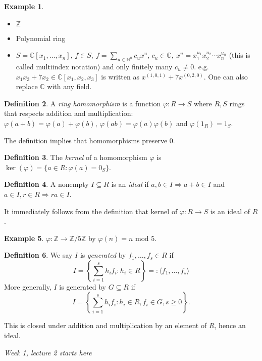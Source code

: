 \documentclass[a4paper]{article}
\newcommand{\Mod}{\text{ mod }}
\theoremstyle{definition}
\newtheorem{defn}{Definition}[subsection]
\newtheorem{example}[defn]{Example}
\begin{document}
\begin{example}
\begin{itemize}
\item $\mathbb Z$
\item Polynomial ring
\item $S=\mathbb C[x_1,\ldots,x_n]$, $\displaystyle f\in S,\ f=\sum_{u\in \mathbb N^n} c_u x^u$, $c_u\in \mathbb C,\ x^u=x_1^{u_1} x_2^{u_2} \cdots x_n^{u_n}$ (this is called multiindex notation) and only finitely many $c_u\neq 0$. e.g. $x_1 x_3 + 7x_2\in \mathbb C[x_1,x_2,x_3]$ is written as $x^{(1,0,1)}+7x^{(0,2,0)}$. One can also replace $\mathbb C$ with any field.
\end{itemize}
\end{example}
\begin{defn}
A \textit{ring homomorphism} is a function $\varphi:R\rightarrow S$ where $R,S$ rings that respects addition and multiplication: $\varphi(a+b)=\varphi(a)+\varphi(b),\ \varphi(ab)=\varphi(a)\varphi(b)$ and $\varphi(1_R)=1_S$.
\end{defn}
The definition implies that homomorphisms preserve 0.

\begin{defn}
The \textit{kernel} of a homomorphism $\varphi$ is $\ker (\varphi) = \{a\in R:\varphi(a)=0_S\}$.
\end{defn}

\begin{defn}
A nonempty $I\subseteq R$ is an \textit{ideal} if $a,b\in I \Rightarrow a+b\in I$ and $a\in I,r\in R\Rightarrow ra\in I$.
\end{defn}

It immediately follows from the definition that kernel of $\varphi:R\rightarrow S$ is an ideal of $R$.

\begin{example}
$\varphi:\mathbb Z \rightarrow \mathbb Z/5\mathbb Z$ by $\varphi(n) = n\Mod 5$.
\end{example}

\begin{defn}
We say $I$ is \textit{generated} by $f_1,\ldots,f_s\in R$ if
\[
I=\left\{\sum_{i=1}^s h_i f_i : h_i\in R \right\} =: \langle f_1,\ldots,f_s\rangle
\]
More generally, $I$ is generated by $G\subseteq R$ if
\[
I=\left\{\sum_{i=1}^s h_i f_i : h_i\in R, f_i\in G,s\geq 0 \right\}.
\]
\end{defn}
This is closed under addition and multiplication by an element of $R$, hence an ideal.

\begin{flushright}
\textit{Week 1, lecture 2 starts here}
\end{flushright}
\end{document}
